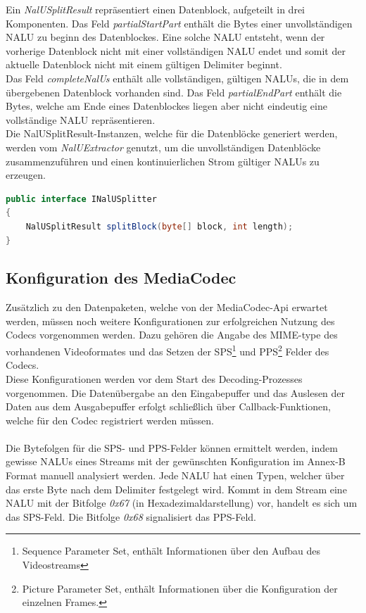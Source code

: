 Ein \textit{NalUSplitResult} repräsentiert einen Datenblock, aufgeteilt in drei Komponenten. Das Feld \textit{partialStartPart} enthält die Bytes einer unvollständigen NALU zu beginn des Datenblockes. Eine solche NALU entsteht, wenn der vorherige Datenblock nicht mit einer vollständigen NALU endet und somit der aktuelle Datenblock nicht mit einem gültigen Delimiter beginnt.\\
Das Feld \textit{completeNalUs} enthält alle vollständigen, gültigen NALUs, die in dem übergebenen Datenblock vorhanden sind. Das Feld \textit{partialEndPart} enthält die Bytes, welche am Ende eines Datenblockes liegen aber nicht eindeutig eine vollständige NALU repräsentieren.\\
Die NalUSplitResult-Instanzen, welche für die Datenblöcke generiert werden, werden vom \textit{NalUExtractor} genutzt, um die unvollständigen Datenblöcke zusammenzuführen und einen kontinuierlichen Strom gültiger NALUs zu erzeugen.\\
\begin{lstlisting}[caption=Definition des INaluUSplitter-Interface, label=lst:i_nalu_splitter, language=Java]
public interface INalUSplitter 
{
    NalUSplitResult splitBlock(byte[] block, int length);
}
\end{lstlisting}

\subsection{Konfiguration des MediaCodec}
Zusätzlich zu den Datenpaketen, welche von der MediaCodec-Api erwartet werden, müssen noch weitere Konfigurationen zur erfolgreichen Nutzung des Codecs vorgenommen werden. Dazu gehören die Angabe des MIME-type des vorhandenen Videoformates und das Setzen der SPS\footnote{Sequence Parameter Set, enthält Informationen über den Aufbau des Videostreams} und PPS\footnote{Picture Parameter Set, enthält Informationen über die Konfiguration der einzelnen Frames.} Felder des Codecs.\\
 Diese Konfigurationen werden vor dem Start des Decoding-Prozesses vorgenommen. Die Datenübergabe an den Eingabepuffer und das Auslesen der Daten aus dem Ausgabepuffer erfolgt schließlich über Callback-Funktionen, welche für den Codec registriert werden müssen. \\
\\
Die Bytefolgen für die SPS- und PPS-Felder können ermittelt werden, indem gewisse NALUs eines Streams mit der gewünschten Konfiguration im Annex-B Format manuell analysiert werden. Jede NALU hat einen Typen, welcher über das erste Byte nach dem Delimiter festgelegt wird. Kommt in dem Stream eine NALU mit der Bitfolge \textit{0x67} (in Hexadezimaldarstellung) vor, handelt es sich um das SPS-Feld. Die Bitfolge \textit{0x68} signalisiert das PPS-Feld. 

